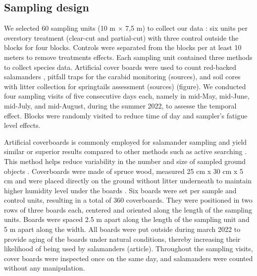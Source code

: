 \subsection*{Sampling design}
\label{subsec:sampling}

We selected 60 sampling units (10 m $\times$ 7,5 m) to collect our data : six units per overstory treatment (clear-cut and partial-cut) with three control outside the blocks for four blocks.
Controls were separated from the blocks per at least 10 meters to remove treatments effects.
Each sampling unit contained three methods to collect species data. 
Artificial cover boards were used to count red-backed salamanders \citep{hesedUncoveringSalamanderEcology2012,mazerolleWoodlandSalamanderPopulation2021a,mooreComparisonPopulationEastern2009c}, 
pitfall traps for the carabid monitoring (sources), and soil cores with litter collection for springtails assessment (sources) (figure).
We conducted four sampling visits of five consecutive days each, namely in mid-May, mid-June, mid-July, and mid-August, during the summer 2022, to assesse the temporal effect. 
Blocks were randomly visited to reduce time of day and sampler's fatigue level effects.

Artificial coverboards is commonly employed for salamander sampling and yield similar or superior results compared to other methods such as active searching \citep{hydeSamplingPlethodontidSalamanders2001,mooreComparisonPopulationEastern2009c}. 
This method helps reduce variability in the number and size of sampled ground objects \citep{hydeSamplingPlethodontidSalamanders2001}. 
Coverboards were made of spruce wood, measured 25 cm x 30 cm x 5 cm and were placed directly on the ground without litter underneath to maintain higher humidity level under the boards \citep{mazerolleWoodlandSalamanderPopulation2021a}. 
Six boards were set per sample and control units, resulting in a total of 360 coverboards.
They were positioned in two rows of three boards each, centered and oriented along the length of the sampling units.
Boards were spaced 2.5 m apart along the length of the sampling unit and 5 m apart along the width.
All boards were put outside during march 2022 to provide aging of the boards under natural conditions, thereby increasing their likelihood of being used by salamanders (article).
Throughout the sampling visits, cover boards were inspected once on the same day, and salamanders were counted without any manipulation.

